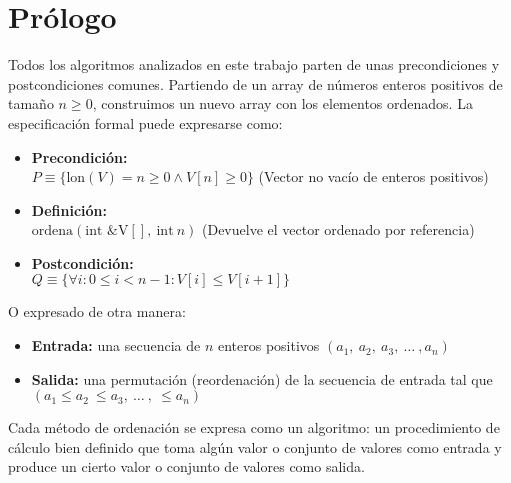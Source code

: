\section{Prólogo}
Todos los algoritmos analizados en este trabajo parten de unas precondiciones y postcondiciones comunes. Partiendo de un array de números enteros positivos de tamaño $n \geq 0$, construimos un nuevo array con los elementos ordenados.  La especificación formal puede expresarse como:
\begin{itemize}
	\item \textbf{Precondición:}\\
		$P \equiv \{\mbox{lon}(V) = n \geq 0 \wedge V[n] \geq 0\}$ (Vector no vacío de enteros positivos)
	\item \textbf{Definición:}\\
		$\mbox{ordena}(\mbox{int \&V} [],\: \mbox{int} \:n)$ (Devuelve el 				vector ordenado por referencia)
	\item \textbf{Postcondición:}\\
		$Q \equiv \{\forall{i} : 0 \leq i < n - 1: V[i] \leq V[i + 1]\}$
\end{itemize}
O expresado de otra manera:\cite{CORMEN} 
\begin{itemize}
	\item \textbf{Entrada:} una secuencia de $n$ enteros positivos $(a_{1},\: a_{2},\: a_{3}, \:  \ldots\: 			,a_{n})$
	\item \textbf{Salida:} una permutación (reordenación) de la secuencia de entrada tal que $(a_{1} \leq 				a_{2}\:  \leq a_{3},\:  \ldots \:  ,\:\leq  a_{n})$
\end{itemize}

Cada método de ordenación se expresa como un algoritmo: un procedimiento de cálculo bien definido que toma algún valor o conjunto de valores como entrada y produce un cierto valor o conjunto de valores como salida.

